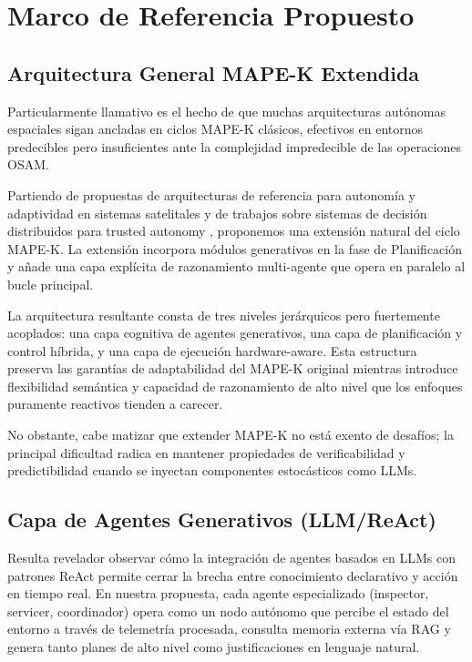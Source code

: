 \section{Marco de Referencia Propuesto}

\subsection{Arquitectura General MAPE-K Extendida}

Particularmente llamativo es el hecho de que muchas arquitecturas autónomas espaciales sigan ancladas en ciclos MAPE-K clásicos, efectivos en entornos predecibles pero insuficientes ante la complejidad impredecible de las operaciones OSAM. 

Partiendo de propuestas de arquitecturas de referencia para autonomía y adaptividad en sistemas satelitales \cite{Basciani2026_RA} y de trabajos sobre sistemas de decisión distribuidos para trusted autonomy \cite{Thangavel2024}, proponemos una extensión natural del ciclo MAPE-K. La extensión incorpora módulos generativos en la fase de Planificación y añade una capa explícita de razonamiento multi-agente que opera en paralelo al bucle principal.

La arquitectura resultante consta de tres niveles jerárquicos pero fuertemente acoplados: una capa cognitiva de agentes generativos, una capa de planificación y control híbrida, y una capa de ejecución hardware-aware. Esta estructura preserva las garantías de adaptabilidad del MAPE-K original mientras introduce flexibilidad semántica y capacidad de razonamiento de alto nivel que los enfoques puramente reactivos tienden a carecer. 

No obstante, cabe matizar que extender MAPE-K no está exento de desafíos; la principal dificultad radica en mantener propiedades de verificabilidad y predictibilidad cuando se inyectan componentes estocásticos como LLMs.

\subsection{Capa de Agentes Generativos (LLM/ReAct)}

Resulta revelador observar cómo la integración de agentes basados en LLMs con patrones ReAct permite cerrar la brecha entre conocimiento declarativo y acción en tiempo real. En nuestra propuesta, cada agente especializado (inspector, servicer, coordinador) opera como un nodo autónomo que percibe el estado del entorno a través de telemetría procesada, consulta memoria externa vía RAG y genera tanto planes de alto nivel como justificaciones en lenguaje natural.

